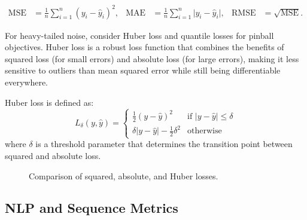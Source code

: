 \begin{align}
\text{MSE} &= \frac{1}{n} \sum_{i=1}^{n} (y_i - \hat{y}_i)^2, &
\text{MAE} &= \frac{1}{n} \sum_{i=1}^{n} \lvert y_i - \hat{y}_i \rvert, &
\text{RMSE} &= \sqrt{\text{MSE}}.
\end{align}

\begin{remark}
For heavy-tailed noise, consider Huber loss and quantile losses for pinball objectives. Huber loss is a robust loss function that combines the benefits of squared loss (for small errors) and absolute loss (for large errors), making it less sensitive to outliers than mean squared error while still being differentiable everywhere.
\end{remark}

\begin{definition}
Huber loss is defined as:
\begin{equation}
L_\delta(y, \hat{y}) = \begin{cases}
\frac{1}{2}(y - \hat{y})^2 & \text{if } |y - \hat{y}| \leq \delta \\
\delta|y - \hat{y}| - \frac{1}{2}\delta^2 & \text{otherwise}
\end{cases}
\end{equation}
where $\delta$ is a threshold parameter that determines the transition point between squared and absolute loss.
\end{definition}

\begin{figure}[h]
  \centering
  \caption{Comparison of squared, absolute, and Huber losses.}
  \label{fig:huber}
\end{figure}

\subsection{NLP and Sequence Metrics}

